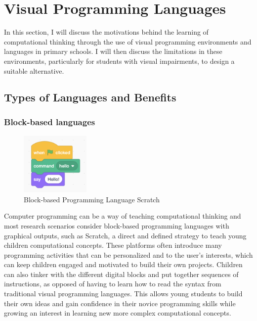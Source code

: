 \documentclass[oneside,%
                    author={Malak Hajji},
                    degree={BSc},
                    title={Designing An Accessible Computational Toolkit For Students},
                  subtitle={With Mixed Visual Abilities}]{dissertation}
\begin{document}
\section{Visual Programming Languages}

In this section, I will discuss the motivations behind the learning of computational thinking through the use of visual programming environments and languages in primary schools.
I will then discuss the limitations in these environments, particularly for students with visual impairments, to design a suitable alternative.

\subsection{Types of Languages and Benefits}
\subsubsection{Block-based languages}
\begin{figure}
    \centering
    \includegraphics[width=0.3\textwidth]{thesis/scratch.eps}
    \caption{Block-based Programming Language Scratch ~\cite{scratch}}
    \label{fig:Fig 1}
\end{figure}
Computer programming can be a way of teaching computational thinking and most research scenarios consider block-based programming languages with graphical outputs, such as Scratch\cite{scratch}, a direct and defined strategy to teach young children computational concepts\cite{blocks}. These platforms often introduce many programming activities that can be personalized and to the user's interests, which can keep children engaged and motivated to build their own projects. Children can also tinker with the different digital blocks and put together sequences of instructions, as opposed of having to learn how to read the syntax from traditional visual programming languages. This allows young students to build their own ideas and gain confidence in their novice programming skills while growing an interest in learning new more complex computational concepts.\cite{confidence}
\end{document}
